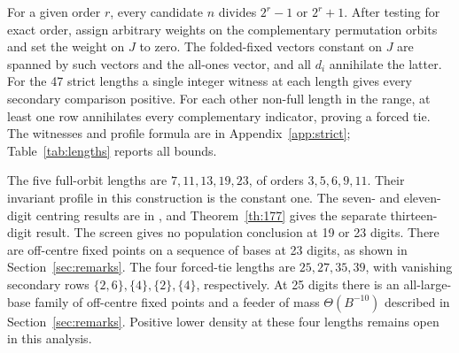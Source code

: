 \documentclass[11pt,reqno]{amsart}
\theoremstyle{remark}
\begin{document}
For a given order \(r\), every candidate \(n\) divides \(2^r-1\)
or \(2^r+1\). After testing for exact order, assign arbitrary
weights on the complementary permutation orbits and set the
weight on \(J\) to zero. The folded-fixed vectors constant on \(J\)
are spanned by such vectors and the all-ones vector, and all
\(d_i\) annihilate the latter. For the 47 strict lengths a single
integer witness at each length gives every secondary comparison
positive. For each other non-full length in the range, at least
one row annihilates every complementary indicator, proving a
forced tie. The witnesses and profile formula are in
Appendix~\ref{app:strict}; Table~\ref{tab:lengths} reports all bounds.

The five full-orbit lengths are \(7,11,13,19,23\), of orders
\(3,5,6,9,11\). Their invariant profile in this construction is
the constant one. The seven- and eleven-digit centring results
are in \cite{G5,G6,G8}, and Theorem~\ref{th:177} gives the separate
thirteen-digit result. The screen gives no population conclusion
at 19 or 23 digits. There are off-centre fixed points on a sequence of
bases at 23 digits, as shown in Section~\ref{sec:remarks}.
The four forced-tie lengths are \(25,27,35,39\), with vanishing
secondary rows \(\{2,6\},\{4\},\{2\},\{4\}\), respectively.
At 25 digits there is an all-large-base family of off-centre fixed
points and a feeder of mass \(\Theta(B^{-10})\) described in
Section~\ref{sec:remarks}. Positive lower density at these four
lengths remains open in this analysis.
\end{document}
